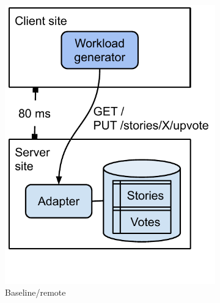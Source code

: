 \begin{figure}[H]
        \centering
        \begin{subfigure}[b]{0.24\textwidth}
            \centering
            \includegraphics[width=\textwidth]{./figures/evaluation/evaluation_deployments_baseline_remote.pdf}
            \caption{Baseline/remote}
            \label{fig:deployments_baseline_remote}
        \end{subfigure}
        \hfill
        \begin{subfigure}[b]{0.24\textwidth}
            \centering

\end{subfigure}
\end{figure}
